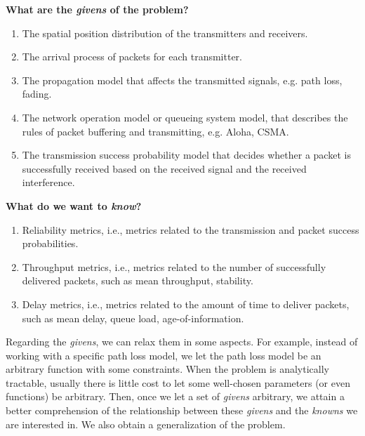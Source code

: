 \textbf{What are the \textit{givens} of the problem?}%
%
\begin{enumerate}[itemsep=1pt]
    \item The spatial position distribution of the transmitters and receivers.
    
    \item The arrival process of packets for each transmitter.
    
    \item The propagation model that affects the transmitted signals, e.g. path loss, fading.
    
    \item The network operation model or queueing system model, that describes the rules of packet buffering and transmitting, e.g. Aloha, CSMA.
    
    \item The transmission success probability model that decides whether a packet is successfully received based on the received signal and the received interference.
\end{enumerate}

\textbf{What do we want to \textit{know}?}%
%
\begin{enumerate}[itemsep=1pt]
    \item Reliability metrics, i.e., metrics related to the transmission and packet success probabilities.

    \item Throughput metrics, i.e., metrics related to the number of successfully delivered packets, such as mean throughput, stability.
    
    \item Delay metrics, i.e., metrics related to the amount of time to deliver packets, such as mean delay, queue load, age-of-information.
\end{enumerate}

Regarding the \textit{givens}, we can relax them in some aspects.
%
For example, instead of working with a specific path loss model, we let the path loss model be an arbitrary function with some constraints.
%
When the problem is analytically tractable, usually there is little cost to let some well-chosen parameters (or even functions) be arbitrary.
%
Then, once we let a set of \textit{givens} arbitrary, we attain a better comprehension of the relationship between these \textit{givens} and the \textit{knowns} we are interested in.
%
We also obtain a generalization of the problem.

